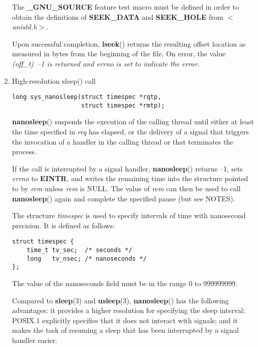 \documentclass[twoside]{article}
\begin{document}
\begin{multicols}{2}
\begin{enumerate}
The
{\bf \_GNU\_SOURCE}
feature test macro must be defined in order to obtain the definitions of
{\bf SEEK\_DATA}
and
{\bf SEEK\_HOLE}
from
{\it $<$unistd.h$>$}{\rm .}

Upon successful completion,
{\bf lseek}{\rm ()}
returns the resulting offset location as measured in bytes from the
beginning of the file.
On error, the value %
\it (off\_t)\ --1 \rm%
is returned and
{\it errno}
is set to indicate the error.

\item
High-resolution sleep() call
{\footnotesize
\begin{lstlisting}
long sys_nanosleep(struct timespec *rqtp,
                   struct timespec *rmtp);
\end{lstlisting}
\par}

{\bf nanosleep}{\rm ()}
suspends the execution of the calling thread
until either at least the time specified in
{\it *req}
has elapsed, or the delivery of a signal
that triggers the invocation of a handler in the calling thread or
that terminates the process.

If the call is interrupted by a signal handler,
{\bf nanosleep}{\rm ()}
returns --1, sets
{\it errno}
to
{\bf EINTR}{\rm ,}
and writes the remaining time into the structure pointed to by
{\it rem}
unless
{\it rem}
is NULL.
The value of
{\it *rem}
can then be used to call
{\bf nanosleep}{\rm ()}
again and complete the specified pause (but see NOTES).

The structure
{\it timespec}
is used to specify intervals of time with nanosecond precision.
It is defined as follows:
\par\vspace{1.0\baselineskip}

{\footnotesize
\begin{lstlisting}
struct timespec {
    time_t tv_sec;  /* seconds */
    long   tv_nsec; /* nanoseconds */
};
\end{lstlisting}
\par}

\par
The value of the nanoseconds field must be in the range 0 to 999999999.

Compared to
{\bf sleep}{\rm (3)}
and
{\bf usleep}{\rm (3),}
{\bf nanosleep}{\rm ()}
has the following advantages:
it provides a higher resolution for specifying the sleep interval;
POSIX.1 explicitly specifies that it
does not interact with signals;
and it makes the task of resuming a sleep that has been
interrupted by a signal handler easier.


\end{enumerate}
\end{multicols}
\end{document}

